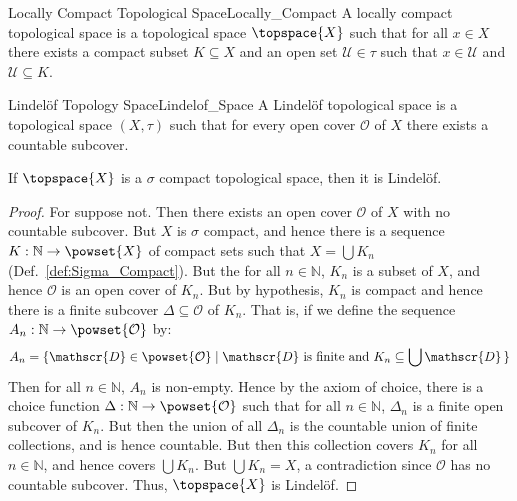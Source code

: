 \documentclass{article}                                                        %
\begin{document}
        \begin{fdefinition}{Locally Compact Topological Space}{Locally_Compact}
            A locally compact topological space is a topological space
            $\topspace{X}$ such that for all $x\in{X}$ there exists a compact
            subset $K\subseteq{X}$ and an open set $\mathcal{U}\in\tau$ such
            that $x\in\mathcal{U}$ and $\mathcal{U}\subseteq{K}$.
        \end{fdefinition}
        \begin{fdefinition}{Lindel\"{o}f Topology Space}{Lindelof_Space}
            A Lindel\"{o}f topological space is a topological space $(X,\tau)$
            such that for every open cover $\mathcal{O}$ of $X$ there exists a
            countable subcover.
        \end{fdefinition}
        \begin{theorem}
            \label{thm:Sigma_Compact_Implies_Lindelof}%
            If $\topspace{X}$ is a $\sigma$ compact topological space, then it
            is Lindel\"{o}f.
        \end{theorem}
        \begin{proof}
            For suppose not. Then there exists an open cover $\mathcal{O}$ of
            $X$ with no countable subcover. But $X$ is $\sigma$ compact, and
            hence there is a sequence $K:\mathbb{N}\rightarrow\powset{X}$ of
            compact sets such that $X=\bigcup{K}_{n}$
            (Def.~\ref{def:Sigma_Compact}). But the for all $n\in\mathbb{N}$,
            $K_{n}$ is a subset of $X$, and hence $\mathcal{O}$ is an open cover
            of $K_{n}$. But by hypothesis, $K_{n}$ is compact and hence there is
            a finite subcover $\Delta\subseteq\mathcal{O}$ of $K_{n}$. That is,
            if we define the sequence
            $A_{n}:\mathbb{N}\rightarrow\powset{\mathcal{O}}$ by:
            \begin{equation}
                A_{n}=\{\mathscr{D}\in\powset{\mathcal{O}}\;|\;
                    \mathscr{D}\textrm{ is finite and }
                    K_{n}\subseteq\bigcup\mathscr{D}\,\}
            \end{equation}
            Then for all $n\in\mathbb{N}$, $A_{n}$ is non-empty. Hence by the
            axiom of choice, there is a choice function
            $\Delta:\mathbb{N}\rightarrow\powset{\mathcal{O}}$ such that for all
            $n\in\mathbb{N}$, $\Delta_{n}$ is a finite open subcover of $K_{n}$.
            But then the union of all $\Delta_{n}$ is the countable union of
            finite collections, and is hence countable. But then this collection
            covers $K_{n}$ for all $n\in\mathbb{N}$, and hence covers
            $\bigcup{K}_{n}$. But $\bigcup{K}_{n}=X$, a contradiction since
            $\mathcal{O}$ has no countable subcover. Thus, $\topspace{X}$ is
            Lindel\"{o}f.
        \end{proof}
\end{document}
